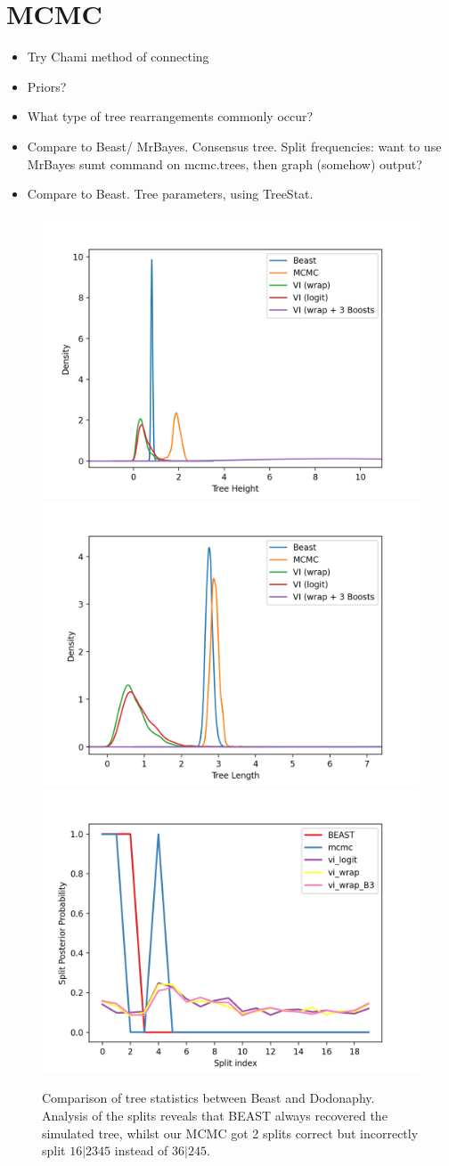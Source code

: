\documentclass[11pt]{article}
\begin{document}
\section{MCMC}

\begin{itemize}
\item Try Chami method of connecting
\item Priors?
\item What type of tree rearrangements commonly occur?
\item Compare to Beast/ MrBayes. Consensus tree. Split frequencies: want to use MrBayes sumt command on mcmc.trees, then graph (somehow) output?
\item Compare to Beast. Tree parameters, using TreeStat. 
\end{itemize}

\begin{figure}[htbp]
\begin{center}
\includegraphics[width=.333\linewidth]{fig/cmp_height}%
\includegraphics[width=.333\linewidth]{fig/cmp_length}%
\includegraphics[width=.333\linewidth]{fig/cmp_splits}
\caption{Comparison of tree statistics between Beast and Dodonaphy. Analysis of the splits reveals that BEAST always recovered the simulated tree, whilst our MCMC got 2 splits correct but incorrectly split $16|2345$ instead of $36|245$.}
\label{fig:stat_cmp}
\end{center}
\end{figure}
\end{document}
